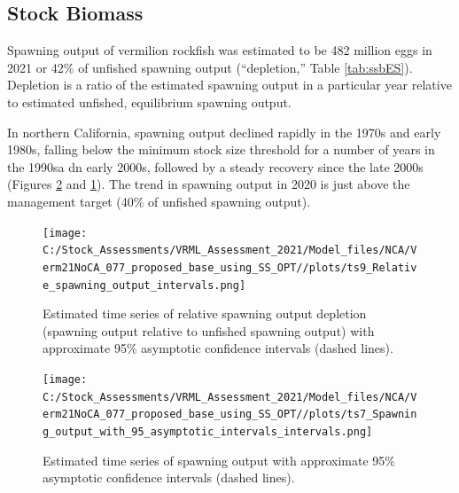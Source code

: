 \documentclass[11pt,
  english,
  a4paper,
]{article}
\begin{document}
\FloatBarrier


\hypertarget{stock-biomass}{%
\subsection*{Stock Biomass}\label{stock-biomass}}

\leavevmode\tagmcend\tagstructend

Spawning output of vermilion rockfish was estimated to be 482 million eggs in 2021 or 42\% of unfished spawning output (``depletion,'' Table \ref{tab:ssbES}). Depletion is a ratio of the estimated spawning output in a particular year relative to estimated unfished, equilibrium spawning output.

In northern California, spawning output declined rapidly in the 1970s and early 1980s, falling below the minimum stock size threshold for a number of years in the 1990sa dn early 2000s, followed by a steady recovery since the late 2000s (Figures \ref{fig:ssbES} and \ref{fig:deplES}). The trend in spawning output in 2020 is just above the management target (40\% of unfished spawning output).

\begin{figure}
\centering
\texttt{[image: C:/Stock\_Assessments/VRML\_Assessment\_2021/Model\_files/NCA/Verm21NoCA\_077\_proposed\_base\_using\_SS\_OPT//plots/ts9\_Relative\_spawning\_output\_intervals.png]}
\caption{Estimated time series of relative spawning output depletion (spawning output relative to unfished spawning output) with approximate 95\% asymptotic confidence intervals (dashed lines).\label{fig:deplES}}
\end{figure}

\begin{figure}
\centering
\texttt{[image: C:/Stock\_Assessments/VRML\_Assessment\_2021/Model\_files/NCA/Verm21NoCA\_077\_proposed\_base\_using\_SS\_OPT//plots/ts7\_Spawning\_output\_with\_95\_asymptotic\_intervals\_intervals.png]}
\caption{Estimated time series of spawning output with approximate 95\% asymptotic confidence intervals (dashed lines).\label{fig:ssbES}}
\end{figure}
\end{document}
